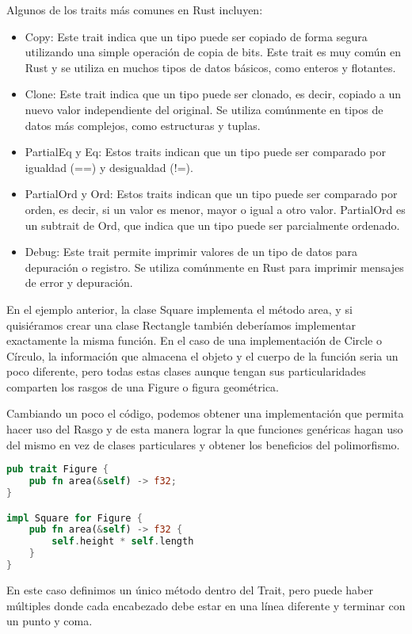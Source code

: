 Algunos de los traits más comunes en Rust incluyen:
\begin{itemize}
    \item Copy: Este trait indica que un tipo puede ser copiado de forma segura utilizando una simple operación de copia de bits. Este trait es muy común en Rust y se utiliza en muchos tipos de datos básicos, como enteros y flotantes.
    \item  Clone: Este trait indica que un tipo puede ser clonado, es decir, copiado a un nuevo valor independiente del original. Se utiliza comúnmente en tipos de datos más complejos, como estructuras y tuplas.
    \item PartialEq y Eq: Estos traits indican que un tipo puede ser comparado por igualdad (==) y desigualdad (!=).
    \item PartialOrd y Ord: Estos traits indican que un tipo puede ser comparado por orden, es decir, si un valor es menor, mayor o igual a otro valor. PartialOrd es un subtrait de Ord, que indica que un tipo puede ser parcialmente ordenado.
    \item Debug: Este trait permite imprimir valores de un tipo de datos para depuración o registro. Se utiliza comúnmente en Rust para imprimir mensajes de error y depuración.
\end{itemize}

En el ejemplo anterior, la clase Square implementa el método area, y si quisiéramos crear una clase Rectangle también deberíamos implementar exactamente la misma función. En el caso de una implementación de Circle o Círculo, la información que almacena el objeto y el cuerpo de la función \textit{} seria un poco diferente, pero todas estas clases aunque tengan sus particularidades comparten los rasgos de una Figure o figura geométrica.

Cambiando un poco el código, podemos obtener una implementación que permita hacer uso del Rasgo y de esta manera lograr la que funciones genéricas hagan uso del mismo en vez de clases particulares y obtener los beneficios del polimorfismo.

\begin{lstlisting}[language=Rust]
pub trait Figure {
    pub fn area(&self) -> f32;
}

impl Square for Figure {
    pub fn area(&self) -> f32 {
        self.height * self.length
    }
}
\end{lstlisting}

En este caso definimos un único método dentro del Trait, pero puede haber múltiples donde cada encabezado debe estar en una línea diferente y terminar con un punto y coma.

